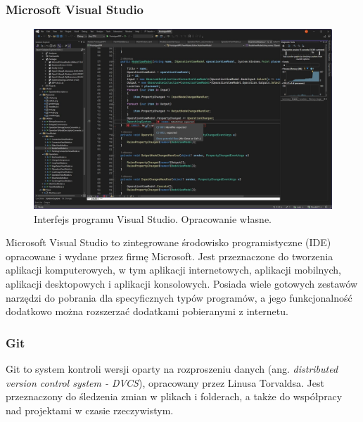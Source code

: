 \subsubsection{Microsoft Visual Studio}
\begin{figure}[H]
    \centering
    \includegraphics[width=1\linewidth]{./images/Picture10.jpg}
    \caption{Interfejs programu Visual Studio. Opracowanie własne.}
    \label{fig:visual}
\end{figure}

Microsoft Visual Studio \cite{visualstudio} to zintegrowane środowisko programistyczne (IDE) opracowane i wydane przez firmę Microsoft. Jest przeznaczone do tworzenia aplikacji komputerowych, w tym aplikacji internetowych, aplikacji mobilnych, aplikacji desktopowych i aplikacji konsolowych. Posiada wiele gotowych zestawów narzędzi do pobrania dla specyficznych typów programów, a jego funkcjonalność dodatkowo można rozszerzać dodatkami pobieranymi z internetu.

\subsubsection{Git}

Git \cite{git} to system kontroli wersji oparty na rozproszeniu danych (ang. \textit{distributed version control system - DVCS}), opracowany przez Linusa Torvaldsa. 
Jest przeznaczony do śledzenia zmian w plikach i folderach, a także do współpracy nad projektami w czasie rzeczywistym. 